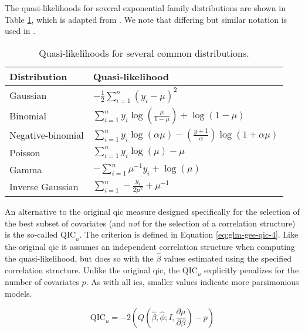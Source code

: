 \documentclass{report}
\renewcommand{\arraystretch}{1.5}
\begin{document}
The quasi-likelihoods for several exponential family distributions are shown in Table \ref{table:quasi-likelihoods}, which is adapted from \cite[Chapter~4]{hardin_generalized_2012}. We note that differing but similar notation is used in \cite[Chapter~2.5.1]{wakefield_bayesian_2013}. 

\renewcommand{\arraystretch}{2}

\begin{table}[h!]
\centering
\begin{tabular}{||l l||} 
  \hline
  \textbf{Distribution} & \textbf{Quasi-likelihood} \\ [0.5ex]
   \hline\hline
   Gaussian & $-\frac{1}{2} \sum_{i=1}^n (y_i - \mu)^2$ \\
   \hline
   Binomial & $\sum_{i=1}^n y_i \log\left(\frac{\mu}{1-\mu}\right) + \log(1-\mu)$ \\
   \hline 
   Negative-binomial & $\sum_{i=1}^n y_i\log(\alpha\mu) - \left(\frac{y+1}{\alpha}\right)\log(1 + \alpha\mu)$ \\
   \hline
   Poisson & $\sum_{i=1}^n y_i\log(\mu) - \mu$ \\
   \hline
   Gamma & $-\sum_{i=1}^n \mu^{-1}y_i + \log(\mu)$ \\
   \hline
   Inverse Gaussian & $\sum_{i=1}^n -\frac{y_i}{2\mu^2} + \mu^{-1}$ \\ 
   \hline
\end{tabular}
\caption{Quasi-likelihoods for several common distributions.}
\label{table:quasi-likelihoods}
\end{table}

\renewcommand{\arraystretch}{1.5}

An alternative to the original \gls{qic} measure designed specifically for the selection of the best subset of covariates (and \textit{not} for the selection of a correlation structure) is the so-called $\text{QIC}_u$. The criterion is defined in Equation \ref{eq:glm-gee-qic-4}. Like the original \gls{qic} it assumes an independent correlation structure when computing the quasi-likelihood, but does so with the $\hat{\beta}$ values estimated using the specified correlation structure. Unlike the original \gls{qic}, the $\text{QIC}_u$ explicitly penalizes for the number of covariates $p$. As with all \glspl{ic}, smaller values indicate more parsimonious models. 

\begin{equation}\label{eq:glm-gee-qic-4}
    \text{QIC}_u = -2 \left(Q\left(\hat{\beta}, \hat{\phi}; I, \frac{\partial\mu}{\partial\beta}\right) - p\right)
\end{equation}
\end{document}

